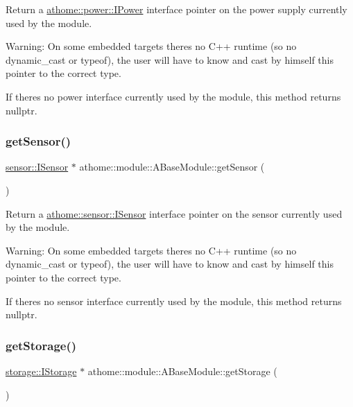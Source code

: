 Return a \mbox{\hyperlink{classathome_1_1power_1_1_i_power}{athome\+::power\+::\+I\+Power}} interface pointer on the power supply currently used by the module.

Warning\+: On some embedded targets there\textquotesingle{}s no C++ runtime (so no {\ttfamily dynamic\+\_\+cast} or {\ttfamily typeof}), the user will have to know and cast by himself this pointer to the correct type.

If there\textquotesingle{}s no power interface currently used by the module, this method returns {\ttfamily nullptr}. \mbox{\label{classathome_1_1module_1_1_a_base_module_abd4cf0d059639c4d09f35d7b1ddd2b4e}} 
\subsubsection{\texorpdfstring{get\+Sensor()}{getSensor()}}
{\footnotesize\ttfamily \mbox{\hyperlink{classathome_1_1sensor_1_1_i_sensor}{sensor\+::\+I\+Sensor}} $\ast$ athome\+::module\+::\+A\+Base\+Module\+::get\+Sensor (\begin{DoxyParamCaption}{ }\end{DoxyParamCaption})}

Return a \mbox{\hyperlink{classathome_1_1sensor_1_1_i_sensor}{athome\+::sensor\+::\+I\+Sensor}} interface pointer on the sensor currently used by the module.

Warning\+: On some embedded targets there\textquotesingle{}s no C++ runtime (so no {\ttfamily dynamic\+\_\+cast} or {\ttfamily typeof}), the user will have to know and cast by himself this pointer to the correct type.

If there\textquotesingle{}s no sensor interface currently used by the module, this method returns {\ttfamily nullptr}. \mbox{\label{classathome_1_1module_1_1_a_base_module_accc6c7f840dab1b1e67fe910c833f0b7}} 
\subsubsection{\texorpdfstring{get\+Storage()}{getStorage()}}
{\footnotesize\ttfamily \mbox{\hyperlink{classathome_1_1storage_1_1_i_storage}{storage\+::\+I\+Storage}} $\ast$ athome\+::module\+::\+A\+Base\+Module\+::get\+Storage (\begin{DoxyParamCaption}{ }\end{DoxyParamCaption})}

